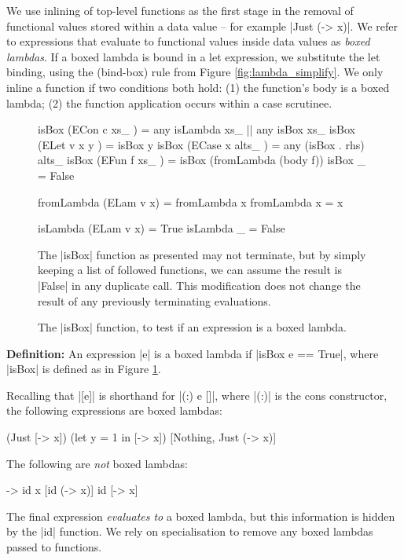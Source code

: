 \documentclass[preprint]{sigplanconf}
\newenvironment{definition}
    {\smallskip
     \noindent\textbf{Definition:}}
    {\noexample}
\begin{document}
We use inlining of top-level functions as the first stage in the removal of functional values stored within a data value -- for example |Just (\x -> x)|. We refer to expressions that evaluate to functional values inside data values as \textit{boxed lambdas}. If a boxed lambda is bound in a let expression, we substitute the let binding, using the (bind-box) rule from Figure \ref{fig:lambda_simplify}. We only inline a function if two conditions both hold: (1) the function's body is a boxed lambda; (2) the function application occurs within a case scrutinee.

\begin{figure}
\begin{code}
isBox (ECon c xs_     )  =  any isLambda xs_ ||  any isBox xs_
isBox (ELet v x y     )  =  isBox y
isBox (ECase x alts_  )  =  any (isBox . rhs) alts_
isBox (EFun f xs_     )  =  isBox (fromLambda (body f))
isBox _                  =  False

fromLambda (ELam v x)  = fromLambda x
fromLambda x           = x

isLambda (ELam v x)  = True
isLambda _           = False
\end{code}

The |isBox| function as presented may not terminate, but by simply keeping a list of followed functions, we can assume the result is |False| in any duplicate call. This modification does not change the result of any previously terminating evaluations.
\caption{The |isBox| function, to test if an expression is a boxed lambda.}
\label{fig:boxed_lambda}
\end{figure}

\begin{definition}
An expression |e| is a boxed lambda if |isBox e == True|, where |isBox| is defined as in Figure \ref{fig:boxed_lambda}.
\end{definition}

\begin{example}
Recalling that |[e]| is shorthand for |(:) e []|, where |(:)| is the cons constructor, the following expressions are boxed lambdas:

\ignore\begin{code}
[\x -> x]
(Just [\x -> x])
(let y = 1 in [\x -> x])
[Nothing, Just (\x -> x)]
\end{code}

\noindent The following are \textit{not} boxed lambdas:

\ignore\begin{code}
\x -> id x
[id (\x -> x)]
id [\x -> x]
\end{code}

The final expression \textit{evaluates to} a boxed lambda, but this information is hidden by the |id| function. We rely on specialisation to remove any boxed lambdas passed to functions.
\end{example}
\end{document}
